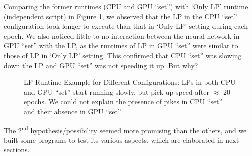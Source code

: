 \begin{appendices}
    Comparing the former runtimes (CPU and GPU ``set'') with `Only LP' runtime (independent script) in Figure \ref{fig:LP Runtime Example for Different Configurations}, we observed that the LP in the CPU ``set'' configuration took longer to execute than that in  `Only LP' setting during each epoch. We also noticed little to no interaction between the neural network in GPU ``set'' with the LP, as the runtimes of LP in GPU ``set'' were similar to those of LP in `Only LP' setting. This confirmed that CPU ``set'' was slowing down the LP and GPU ``set'' was not speeding it up. But why?
    \begin{figure}[!htbp]
        \centering
        \caption[LP Runtime Example for Different Configurations]{LP Runtime Example for Different Configurations: LPs in both CPU and GPU ``set'' start running slowly, but pick up speed after $\approx$ 20 epochs. We could not explain the presence of pikes in CPU ``set'' and their absence in GPU ``set''.}
        \label{fig:LP Runtime Example for Different Configurations}
    \end{figure}
    
    
    The 2\textsuperscript{nd} hypothesis/possibility seemed more promising than the others, and we built some programs to test its various aspects, which are elaborated in next sections.
    

\end{appendices}
